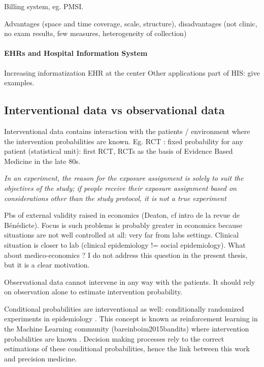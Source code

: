 \documentclass{report}
\begin{document}
Billing system, eg. PMSI.

Advantages (space and time coverage, scale, structure), disadvantages (not clinic, no exam results, few measures, heterogeneity of collection)

\paragraph{EHRs and Hospital Information System}

Increasing informatization
EHR at the center
Other applications part of HIS: give examples.

\subsection{Interventional data vs observational
  data}\label{subsec:intro:interventional_vs_observational}


Interventional data contains interaction with the patients / environment where
the intervention probabilities are known. Eg. RCT : fixed probability for any
patient (statistical unit): first RCT, RCTs as the basis of Evidence Based
Medicine in the late 80s.

\textit{In an experiment, the reason for the exposure assignment is solely to
  suit the objectives of the study; if people receive their exposure assignment
  based on considerations other than the study protocol, it is not a true
  experiment} \citep{rothman2012epidemiology}

Pbs of external validity raised in economics (Deaton, cf intro de la revue de
Bénédicte). Focus is such problems is probably greater in economics because
situations are not well controlled at all: very far from labs settings. Clinical
situation is closer to lab (clinical epidemiology != social epidemiology). What
about medico-economics ? I do not address this question in the present thesis,
but it is a clear motivation.

%
Observational data cannot intervene in any way with the patients. It should rely
on observation alone to estimate intervention probability.

Conditional probabilities are interventional as well: conditionally randomized
experiments in epidemiology \citep{hernan2020causal}. This concept is known as
reinforcement learning in the Machine Learning community (bareinboim2015bandits)
where intervention probabilities are known \cite{bareinboim2015bandits}.
Decision making processes rely to the correct estimations of these
conditional probabilities, hence the link between this work and precision medicine.
\end{document}
